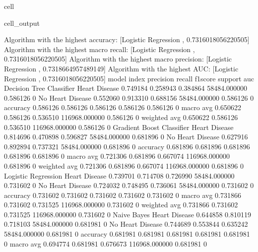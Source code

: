 \documentclass[letterpaper,10pt,english]{jupyterBook}
\begin{document}
\begin{sphinxuseclass}{cell}
\begin{sphinxVerbatimOutput}
\begin{sphinxuseclass}{cell_output}
\begin{sphinxVerbatim}[commandchars=\\\{\}]
Algorithm with the highest accuracy: [\PYGZsq{}Logistic Regression \PYGZsq{}, 0.7316018056220505]
Algorithm with the highest macro recall:
        [\PYGZsq{}Logistic Regression \PYGZsq{}, 0.7316018056220505]
Algorithm with the highest macro precision:
        [\PYGZsq{}Logistic Regression \PYGZsq{}, 0.7318664957489149]
Algorithm with the highest AUC:
        [\PYGZsq{}Logistic Regression \PYGZsq{}, 0.7316018056220505]
model                      index             precision  recall    f1\PYGZhy{}score  support        auc     
Decision Tree Classifier   Heart Disease     0.749184   0.258943  0.384864  58484.000000   0.586126    0
                           No Heart Disease  0.552060   0.913310  0.688156  58484.000000   0.586126    0
                           accuracy          0.586126   0.586126  0.586126  0.586126       0.586126    0
                           macro avg         0.650622   0.586126  0.536510  116968.000000  0.586126    0
                           weighted avg      0.650622   0.586126  0.536510  116968.000000  0.586126    0
Gradient Boost Classifier  Heart Disease     0.814696   0.470898  0.596827  58484.000000   0.681896    0
                           No Heart Disease  0.627916   0.892894  0.737321  58484.000000   0.681896    0
                           accuracy          0.681896   0.681896  0.681896  0.681896       0.681896    0
                           macro avg         0.721306   0.681896  0.667074  116968.000000  0.681896    0
                           weighted avg      0.721306   0.681896  0.667074  116968.000000  0.681896    0
Logistic Regression        Heart Disease     0.739701   0.714708  0.726990  58484.000000   0.731602    0
                           No Heart Disease  0.724032   0.748495  0.736061  58484.000000   0.731602    0
                           accuracy          0.731602   0.731602  0.731602  0.731602       0.731602    0
                           macro avg         0.731866   0.731602  0.731525  116968.000000  0.731602    0
                           weighted avg      0.731866   0.731602  0.731525  116968.000000  0.731602    0
Naive Bayes                Heart Disease     0.644858   0.810119  0.718103  58484.000000   0.681981    0
                           No Heart Disease  0.744689   0.553844  0.635242  58484.000000   0.681981    0
                           accuracy          0.681981   0.681981  0.681981  0.681981       0.681981    0
                           macro avg         0.694774   0.681981  0.676673  116968.000000  0.681981    0

\end{sphinxVerbatim}
\end{sphinxuseclass}
\end{sphinxVerbatimOutput}
\end{sphinxuseclass}
\end{document}
